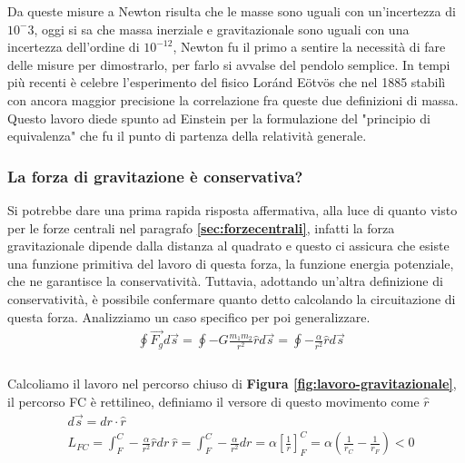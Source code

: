 \documentclass[10pt,a4paper]{article}
\begin{document}
 Da queste misure a Newton risulta che le masse sono uguali con un'incertezza di $10^-3$, oggi si sa che massa inerziale e gravitazionale sono uguali con una incertezza dell'ordine di $10^{-12}$, Newton fu il primo a sentire la necessità di fare delle misure per dimostrarlo, per farlo si avvalse del pendolo semplice. In tempi più recenti è celebre l'esperimento del fisico Loránd Eötvös che nel 1885 stabilì con ancora maggior precisione la correlazione fra queste due definizioni di massa. Questo lavoro diede spunto ad Einstein per la formulazione del "principio di equivalenza" che fu il punto di partenza della relatività generale.
 \subsubsection{La forza di gravitazione è conservativa?}
Si potrebbe dare una prima rapida risposta affermativa, alla luce di quanto visto per le forze centrali nel paragrafo \textbf{\ref{sec:forzecentrali}}, infatti la forza gravitazionale dipende dalla distanza al quadrato e questo ci assicura che esiste una funzione primitiva del lavoro di questa forza, la funzione energia potenziale, che ne garantisce la conservatività. Tuttavia, adottando un'altra definizione di conservatività, è possibile confermare quanto detto calcolando la circuitazione di questa forza. Analizziamo un caso specifico per poi generalizzare.
\begin{align*}
	&\oint \vec{F_g}d\vec{s}=\oint -G\frac{m_1 m_2}{r^2}\hat{r}d\vec{s} = \oint -\frac{\alpha}{r^2}\hat{r}d\vec{s}\\
\end{align*}\\
Calcoliamo il lavoro nel percorso chiuso di \textbf{Figura \ref{fig:lavoro-gravitazionale}}, il percorso FC è rettilineo, definiamo il versore di questo movimento come  $\hat{r}$
\begin{align*}
	&d\vec{s} = dr \cdot \hat{r}\\
	&L_{FC} = \int_F^C -\frac{\alpha}{r^2}\hat{r}dr\ \hat{r} = \int_F^C -\frac{\alpha}{r^2} dr = \alpha[\frac{1}{r}]_F^C = \alpha(\frac{1}{r_C}-\frac{1}{r_F}) < 0
\end{align*}
\end{document}
